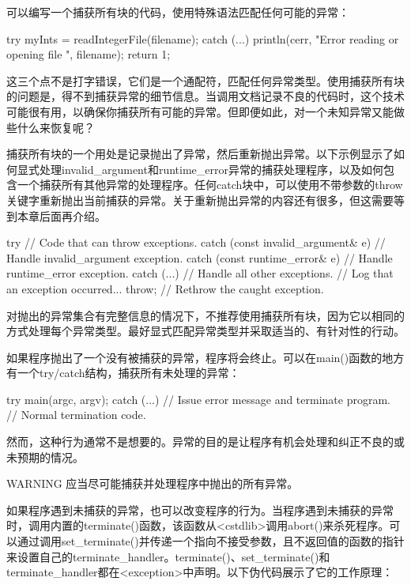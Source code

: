 可以编写一个捕获所有块的代码，使用特殊语法匹配任何可能的异常：

\begin{cpp}
try {
    myInts = readIntegerFile(filename);
} catch (...) {
    println(cerr, "Error reading or opening file {}", filename);
    return 1;
}
\end{cpp}

这三个点不是打字错误，它们是一个通配符，匹配任何异常类型。使用捕获所有块的问题是，得不到捕获异常的细节信息。当调用文档记录不良的代码时，这个技术可能很有用，以确保你捕获所有可能的异常。但即便如此，对一个未知异常又能做些什么来恢复呢？

捕获所有块的一个用处是记录抛出了异常，然后重新抛出异常。以下示例显示了如何显式处理invalid\_argument和runtime\_error异常的捕获处理程序，以及如何包含一个捕获所有其他异常的处理程序。任何catch块中，可以使用不带参数的throw关键字重新抛出当前捕获的异常。关于重新抛出异常的内容还有很多，但这需要等到本章后面再介绍。

\begin{cpp}
try {
    // Code that can throw exceptions.
} catch (const invalid_argument& e) {
    // Handle invalid_argument exception.
} catch (const runtime_error& e) {
    // Handle runtime_error exception.
} catch (...) {
    // Handle all other exceptions.
    // Log that an exception occurred...
    throw; // Rethrow the caught exception.
}
\end{cpp}

对抛出的异常集合有完整信息的情况下，不推荐使用捕获所有块，因为它以相同的方式处理每个异常类型。最好显式匹配异常类型并采取适当的、有针对性的行动。


如果程序抛出了一个没有被捕获的异常，程序将会终止。可以在main()函数的地方有一个try/catch结构，捕获所有未处理的异常：

\begin{cpp}
try {
    main(argc, argv);
} catch (...) {
    // Issue error message and terminate program.
}
// Normal termination code.
\end{cpp}

然而，这种行为通常不是想要的。异常的目的是让程序有机会处理和纠正不良的或未预期的情况。

\begin{myWarning}{WARNING}
应当尽可能捕获并处理程序中抛出的所有异常。
\end{myWarning}

如果程序遇到未捕获的异常，也可以改变程序的行为。当程序遇到未捕获的异常时，调用内置的terminate()函数，该函数从<cstdlib>调用abort()来杀死程序。可以通过调用set\_terminate()并传递一个指向不接受参数，且不返回值的函数的指针来设置自己的terminate\_handler。terminate()、set\_terminate()和terminate\_handler都在<exception>中声明。以下伪代码展示了它的工作原理：

